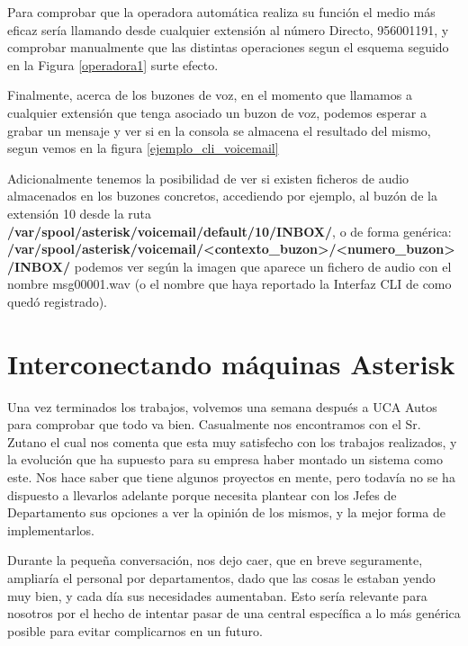 
Para comprobar que la operadora automática realiza su función el medio más eficaz sería llamando desde cualquier extensión al número Directo, 956001191, y comprobar manualmente que las distintas operaciones segun el esquema seguido en la Figura \ref{operadora1} surte efecto.

Finalmente, acerca de los buzones de voz, en el momento que llamamos a cualquier extensión que tenga asociado un buzon de voz, podemos esperar a grabar un mensaje y ver si en la consola se almacena el resultado del mismo, segun vemos en la figura \ref{ejemplo_cli_voicemail}

Adicionalmente tenemos la posibilidad de ver si existen ficheros de audio almacenados en los buzones concretos, accediendo por ejemplo, al buzón de la extensión 10 desde la ruta \textbf{/var/spool/asterisk/voicemail/default/10/INBOX/}, o de forma genérica: \\ \textbf{/var/spool/asterisk/voicemail/<contexto\_buzon>/<numero\_buzon>/INBOX/} podemos ver según la imagen que aparece un fichero de audio con el nombre msg00001.wav (o el nombre que haya reportado la Interfaz CLI de como quedó registrado).


\newpage

\color[rgb]{0,0,1}

\section{Interconectando máquinas Asterisk}

Una vez terminados los trabajos, volvemos una semana después a UCA Autos para comprobar que todo va bien. Casualmente nos encontramos con el Sr. Zutano el cual nos comenta que esta muy satisfecho con los trabajos realizados, y la evolución que ha supuesto para su empresa haber montado un sistema como este. Nos hace saber que tiene algunos proyectos en mente, pero todavía no se ha dispuesto a llevarlos adelante porque necesita plantear con los Jefes de Departamento sus opciones a ver la opinión de los mismos, y la mejor forma de implementarlos. 

Durante la pequeña conversación, nos dejo caer, que en breve seguramente, ampliaría el personal por departamentos, dado que las cosas le estaban yendo muy bien, y cada día sus necesidades aumentaban. Esto sería relevante para nosotros por el hecho de intentar pasar de una central específica a lo más genérica posible para evitar complicarnos en un futuro.


